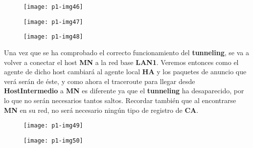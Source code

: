 \documentclass[10pt]{article}
\begin{document}
\begin{figure}[H]
	\begin{center}
 		\texttt{[image: p1-img46]}
	\end{center} 
\end{figure}

\begin{figure}[H]
	\begin{center}
 		\texttt{[image: p1-img47]}
	\end{center} 
\end{figure}

\begin{figure}[H]
	\begin{center}
 		\texttt{[image: p1-img48]}
	\end{center} 
\end{figure}


Una vez que se ha comprobado el correcto funcionamiento del \textbf{tunneling}, se va a volver a conectar el host \textbf{MN} a la red base \textbf{LAN1}. Veremos entonces como el agente de dicho host cambiará al agente local \textbf{HA} y los paquetes de anuncio que verá serán de éste, y como ahora el traceroute para llegar desde \textbf{HostIntermedio} a \textbf{MN} es diferente ya que el \textbf{tunneling} ha desaparecido, por lo que no serán necesarios tantos saltos. Recordar también que al encontrarse \textbf{MN} en su red, no será necesario ningún tipo de registro de \textbf{CA}.

\begin{figure}[H]
	\begin{center}
 		\texttt{[image: p1-img49]}
	\end{center} 
\end{figure}

\begin{figure}[H]
	\begin{center}
 		\texttt{[image: p1-img50]}
	\end{center} 
\end{figure}
\end{document}
